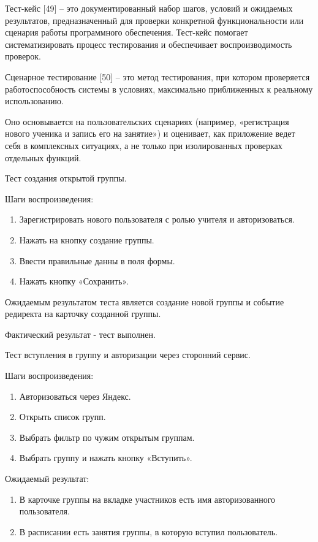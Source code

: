 \documentclass[a4paper,14pt,oneside]{extreport}
\begin{document}
Тест-кейс [49] – это документированный набор шагов, условий и ожидаемых результатов, предназначенный для проверки конкретной функциональности или сценария работы программного обеспечения. Тест-кейс помогает систематизировать процесс тестирования и обеспечивает воспроизводимость проверок.

Сценарное тестирование [50] – это метод тестирования, при котором проверяется работоспособность системы в условиях, максимально приближенных к реальному использованию. 

Оно основывается на пользовательских сценариях (например, «регистрация нового ученика и запись его на занятие») и оценивает, как приложение ведет себя в комплексных ситуациях, а не только при изолированных проверках отдельных функций.


Тест создания открытой группы.

Шаги воспроизведения:
\begin{enumerate}
    \item Зарегистрировать нового пользователя с ролью учителя и авторизоваться.
    \item Нажать на кнопку создание группы.
    \item Ввести правильные данны в поля формы.
    \item Нажать кнопку «Сохранить».
\end{enumerate}

Ожидаемым результатом теста является создание новой группы и событие редиректа на карточку созданной группы.

Фактический результат - тест выполнен.

Тест вступления в группу и авторизации через сторонний сервис.

Шаги воспроизведения:
\begin{enumerate}
    \item Авторизоваться через Яндекс.
    \item Открыть список групп.
    \item Выбрать фильтр по чужим открытым группам.
    \item Выбрать группу и нажать кнопку «Вступить».
\end{enumerate}

Ожидаемый результат:
\begin{enumerate}
    \item В карточке группы на вкладке участников есть имя авторизованного пользователя.
    \item В расписании есть занятия группы, в которую вступил пользователь.
\end{enumerate}
\end{document}
